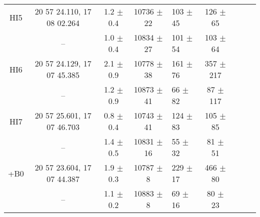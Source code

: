 \documentclass[]{aa} %
\begin{document}
\begin{table*}
\begin{center}
\begin{tabular}{c c c c l c c c c}
     HI5   %
             &  20 57 24.110, 17 08 02.264                          &  1.2 $\pm$ 0.4         & 10736 $\pm$ 22      & 103 $\pm$ 45      & 126 $\pm$ 65     \\
             & --                          &  1.0 $\pm$ 0.4         & 10834 $\pm$ 27      & 101 $\pm$ 54      & 103 $\pm$ 64     \\

     HI6   %
             & 20 57 24.129, 17 07 45.385                         &  2.1 $\pm$ 0.9         & 10778 $\pm$ 38      & 161 $\pm$ 76      & 357 $\pm$ 217     \\
             & --                          &  1.2 $\pm$ 0.9         & 10873 $\pm$ 41      & 66  $\pm$ 82      & 87 $\pm$ 117     \\

     HI7   %
             &  20 57 25.601, 17 07 46.703                          &  0.8 $\pm$ 0.4         & 10743 $\pm$ 41      & 124 $\pm$ 83      & 105 $\pm$ 85      \\
             & --                          &  1.4 $\pm$ 0.5         & 10831 $\pm$ 16      & 55  $\pm$ 32      & 81 $\pm$ 51      \\


     +B0   %
             & 20 57 23.604, 17 07 44.387                         &  1.9 $\pm$ 0.3         & 10787 $\pm$ 8        & 229 $\pm$ 17      & 466 $\pm$ 80     \\
             & --                          &  1.1 $\pm$ 0.2         & 10883 $\pm$ 8       & 69  $\pm$ 16      & 80 $\pm$ 23      \\


\end{tabular}
\end{center}
\end{table*}
\end{document}
